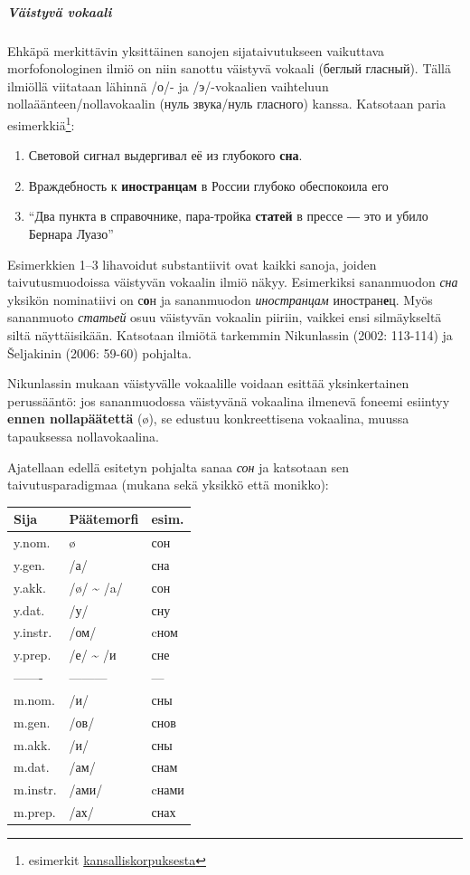 \documentclass[]{scrartcl}
\providecommand{\tightlist}{%
  \setlength{\itemsep}{0pt}\setlength{\parskip}{0pt}}
\begin{document}
\subparagraph{Väistyvä vokaali}\label{vuxe4istyvuxe4-vokaali}

Ehkäpä merkittävin yksittäinen sanojen sijataivutukseen vaikuttava
morfofonologinen ilmiö on niin sanottu väistyvä vokaali (беглый
гласный). Tällä ilmiöllä viitataan lähinnä /о/- ja /э/-vokaalien
vaihteluun nollaäänteen/nollavokaalin (нуль звука/нуль гласного) kanssa.
Katsotaan paria esimerkkiä\footnote{esimerkit
  \href{http://ruscorpora.ru}{kansalliskorpuksesta}}:

\begin{enumerate}
\def\labelenumi{(\arabic{enumi})}
\tightlist
\item
  Световой сигнал выдергивал её из глубокого \textbf{сна}.
\item
  Враждебность к \textbf{иностранцам} в России глубоко обеспокоила его
\item
  ``Два пункта в справочнике, пара-тройка \textbf{статей} в прессе ― это
  и убило Бернара Луазо''
\end{enumerate}

Esimerkkien 1--3 lihavoidut substantiivit ovat kaikki sanoja, joiden
taivutusmuodoissa väistyvän vokaalin ilmiö näkyy. Esimerkiksi
sananmuodon \emph{сна} yksikön nominatiivi on с\textbf{о}н ja
sananmuodon \emph{иностранцам} иностран\textbf{е}ц. Myös sananmuoto
\emph{статьей} osuu väistyvän vokaalin piiriin, vaikkei ensi
silmäykseltä siltä näyttäisikään. Katsotaan ilmiötä tarkemmin
Nikunlassin (2002: 113-114) ja Šeljakinin (2006: 59-60) pohjalta.

Nikunlassin mukaan väistyvälle vokaalille voidaan esittää yksinkertainen
perussääntö: jos sananmuodossa väistyvänä vokaalina ilmenevä foneemi
esiintyy \textbf{ennen nollapäätettä} (ø), se edustuu konkreettisena
vokaalina, muussa tapauksessa nollavokaalina.

Ajatellaan edellä esitetyn pohjalta sanaa \emph{сон} ja katsotaan sen
taivutusparadigmaa (mukana sekä yksikkö että monikko):

\begin{longtable}[c]{@{}lll@{}}
\toprule
Sija & Päätemorfi & esim.\tabularnewline
\midrule
\endhead
y.nom. & ø & сон\tabularnewline
y.gen. & /а/ & сна\tabularnewline
y.akk. & /ø/ \textasciitilde{} /a/ & сон\tabularnewline
y.dat. & /у/ & сну\tabularnewline
y.instr. & /ом/ & cном\tabularnewline
y.prep. & /е/ \textasciitilde{} /и & сне\tabularnewline
------- & --------- & ---\tabularnewline
m.nom. & /и/ & сны\tabularnewline
m.gen. & /ов/ & снов\tabularnewline
m.akk. & /и/ & сны\tabularnewline
m.dat. & /ам/ & снам\tabularnewline
m.instr. & /ами/ & cнами\tabularnewline
m.prep. & /ах/ & снах\tabularnewline
\bottomrule
\end{longtable}
\end{document}
